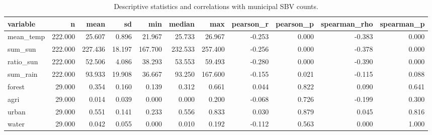 \begin{table}[t]
\caption{Descriptive statistics and correlations with municipal SBV counts.}
\label{tb:sbv4}
\centering
\begin{tabular}{lrrrrrrrrrr}
\hline
\textbf{variable} & \textbf{n} & \textbf{mean} & \textbf{sd} & \textbf{min} & \textbf{median} & \textbf{max} & \textbf{pearson\_r} & \textbf{pearson\_p} & \textbf{spearman\_rho} & \textbf{spearman\_p}
\\
\hline
mean\_temp & 222.000 & 25.607 & 0.896 & 21.967 & 25.733 & 26.967 & -0.253 & 0.000 & -0.383 & 0.000 \\
sum\_sun & 222.000 & 227.436 & 18.197 & 167.700 & 232.533 & 257.400 & -0.256 & 0.000 & -0.378 & 0.000 \\
ratio\_sun & 222.000 & 52.506 & 4.086 & 38.293 & 53.553 & 59.493 & -0.280 & 0.000 & -0.390 & 0.000 \\
sum\_rain & 222.000 & 93.933 & 19.908 & 36.667 & 93.250 & 167.600 & -0.155 & 0.021 & -0.115 & 0.088 \\
forest & 29.000 & 0.354 & 0.160 & 0.139 & 0.312 & 0.661 & 0.044 & 0.822 & 0.090 & 0.641 \\
agri & 29.000 & 0.014 & 0.039 & 0.000 & 0.000 & 0.200 & -0.068 & 0.726 & -0.199 & 0.300 \\
urban & 29.000 & 0.551 & 0.141 & 0.233 & 0.556 & 0.833 & 0.030 & 0.879 & 0.045 & 0.816 \\
water & 29.000 & 0.042 & 0.055 & 0.000 & 0.010 & 0.192 & -0.112 & 0.563 & 0.000 & 1.000 \\
\hline
\end{tabular}
\end{table}
